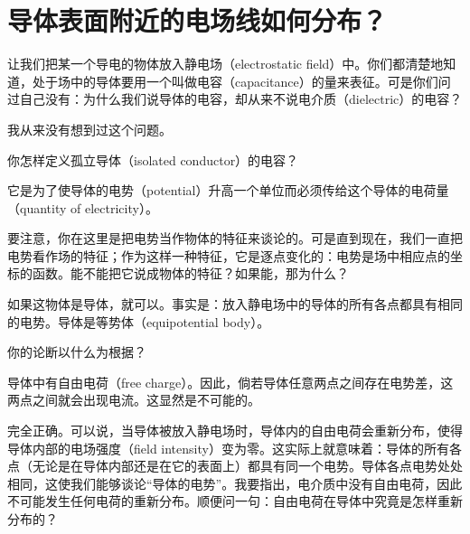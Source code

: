 \chapter[导体表面附近的电场线如何分布？]{导体表面附近的电场线如何分布？\label{ch-24}}

\begin{dialogue}

\tchr 让我们把某一个导电的物体放入静电场（electrostatic field）中。你们都清楚地知道，处于场中的导体要用一个叫做电容（capacitance）的量来表征。可是你们问过自己没有：为什么我们说导体的电容，却从来不说电介质（dielectric）的电容？

\stda 我从来没有想到过这个问题。

\tchr 你怎样定义孤立导体（isolated conductor）的电容？

\stda 它是为了使导体的电势（potential）升高一个单位而必须传给这个导体的电荷量（quantity of electricity）。

\tchr 要注意，你在这里是把电势当作物体的特征来谈论的。可是直到现在，我们一直把电势看作场的特征；作为这样一种特征，它是逐点变化的：电势是场中相应点的坐标的函数。能不能把它说成物体的特征？如果能，那为什么？

\stdb 如果这物体是导体，就可以。事实是：放入静电场中的导体的所有各点都具有相同的电势。导体是等势体（equipotential body）。

\tchr 你的论断以什么为根据？

\stdb 导体中有自由电荷（free charge）。因此，倘若导体任意两点之间存在电势差，这两点之间就会出现电流。这显然是不可能的。

\tchr 完全正确。可以说，当导体被放入静电场时，导体内的自由电荷会重新分布，使得导体内部的电场强度（field intensity）变为零。这实际上就意味着：导体的所有各点（无论是在导体内部还是在它的表面上）都具有同一个电势。导体各点电势处处相同，这使我们能够谈论“导体的电势”。我要指出，电介质中没有自由电荷，因此不可能发生任何电荷的重新分布。顺便问一句：自由电荷在导体中究竟是怎样重新分布的？


\end{dialogue}
